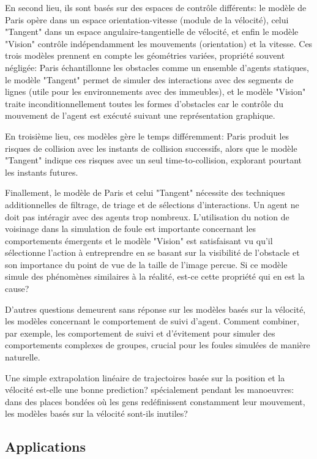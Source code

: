 \documentclass[11pt]{article}
\begin{document}
En second lieu, ils sont basés sur des espaces de contrôle différents: le modèle de Paris opère dans un espace orientation-vitesse (module de la vélocité), celui "Tangent" dans un espace angulaire-tangentielle de vélocité, et enfin le modèle "Vision" contrôle indépendamment les mouvements (orientation) et la vitesse. Ces trois modèles prennent en compte les géométries variées, propriété souvent négligée: Paris échantillonne les obstacles comme un ensemble d'agents statiques, le modèle "Tangent" permet de simuler des interactions avec des segments de lignes (utile pour les environnements avec des immeubles), et le modèle "Vision" traite inconditionnellement toutes les formes d'obstacles car le contrôle du mouvement de l'agent est exécuté suivant une représentation graphique.

En troisième lieu, ces modèles gère le temps différemment: Paris produit les risques de collision avec les instants de collision successifs, alors que le modèle "Tangent" indique ces risques avec un seul time-to-collision, explorant pourtant les instants futures.

Finallement, le modèle de Paris et celui "Tangent" nécessite des techniques additionnelles de filtrage, de triage et de sélections d'interactions. Un agent ne doit pas intéragir avec des agents trop nombreux. L'utilisation du notion de voisinage dans la simulation de foule est importante concernant les comportements émergents et le modèle "Vision" est satisfaisant vu qu'il sélectionne l'action à entreprendre en se basant sur la visibilité de l'obstacle et son importance du point de vue de la taille de l'image percue. Si ce modèle simule des phénomènes similaires à la réalité, est-ce cette propriété qui en est la cause?

D'autres questions demeurent sans réponse sur les modèles basés sur la vélocité, les modèles concernant le comportement de suivi d'agent. Comment combiner, par exemple, les comportement de suivi et d'évitement pour simuler des comportements complexes de groupes, crucial pour les foules simulées de manière naturelle.

Une simple extrapolation linéaire de trajectoires basée sur la position et la vélocité est-elle une bonne prediction? spécialement pendant les manoeuvres: dans des places bondées où les gens redéfinissent constamment leur mouvement, les modèles basés sur la vélocité sont-ils inutiles?

\subsection{Applications}
\end{document}
